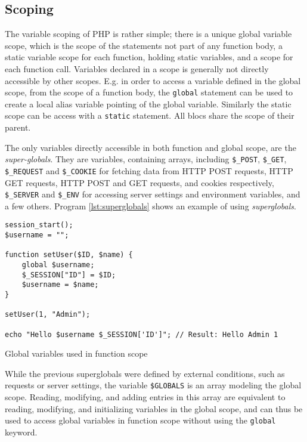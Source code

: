 \subsection{Scoping}
\label{sec:backg_scoping}

The variable scoping of PHP is rather simple; there is a unique global variable scope, which is the scope of the statements not part of any function body, a static variable scope for each function, holding static variables, and a scope for each function call. Variables declared in a scope is generally not directly accessible by other scopes. E.g. in order to access a variable defined in the global scope, from the scope of a function body, the \texttt{global} statement can be used to create a local alias variable pointing of the global variable. Similarly the static scope can be access with a \texttt{static} statement. All blocs share the scope of their parent.

The only variables directly accessible in both function and global scope, are the \emph{super-globals}. They are variables, containing arrays, including \texttt{\$\_POST}, \texttt{\$\_GET}, \texttt{\$\_REQUEST} and \texttt{\$\_COOKIE} for fetching data from HTTP POST requests, HTTP GET requests, HTTP POST and GET requests, and cookies respectively, \texttt{\$\_SERVER} and \texttt{\$\_ENV} for accessing server settings and environment variables, and a few others. Program \ref{lst:superglobals} shows an example of using \emph{superglobals}.
\begin{program}
\begin{lstlisting}
session_start();
$username = "";

function setUser($ID, $name) {
    global $username;
    $_SESSION["ID"] = $ID;
    $username = $name;
}

setUser(1, "Admin");

echo "Hello $username $_SESSION['ID']"; // Result: Hello Admin 1
\end{lstlisting}
\caption{Global variables used in function scope}
\label{lst:superglobals}
\end{program}

While the previous superglobals were defined by external conditions, such as requests or server settings, the variable \texttt{\$GLOBALS} is an array modeling the global scope. Reading, modifying, and adding entries in this array are equivalent to reading, modifying, and initializing variables in the global scope, and can thus be used to access global variables in function scope without using the \texttt{global} keyword.


